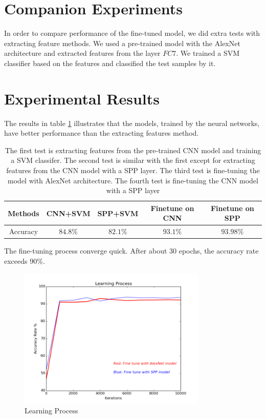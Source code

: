 \section{Companion Experiments}

In order to compare performance of the fine-tuned model, we did extra tests with extracting feature methods. We used a pre-trained model with the AlexNet architecture and extracted features from the layer $FC7$. We trained a SVM classifier based on the features and classified the test samples by it.

\section{Experimental Results}

The results in table \ref{ExpRes} illustrates that the models, trained by the neural networks, have better performance than the extracting features method. 

\begin{table}[h]
\begin{center}
    \begin{tabular}{| c | c | c | c | c |}
    \hline
    Methods & CNN+SVM & SPP+SVM & Finetune on CNN & Finetune on SPP  \\ \hline
    Accuracy & $84.8\%$ & $82.1\%$ & $93.1\%$ & $93.98\%$ \\ \hline
    \end{tabular}
    \caption{The first test is extracting features from the pre-trained CNN model and training a SVM classifer. The second test is similar with the first except for extracting features from the CNN model with a SPP layer. The third test is fine-tuning the model with AlexNet architecture. The fourth test is fine-tuning the CNN model with a SPP layer}
    \label{ExpRes}
\end{center}
\end{table}

The fine-tuning process converge quick. After about 30 epochs, the accuracy rate exceeds $90\%$. 
\graphicspath{ {./Figures/} }
\begin{figure}[!htb]
    \centering
	\includegraphics[width=0.8\textwidth]{FinetuneAccuracy.png}
    \caption{Learning Process}%
    \label{fig:finetuneprocess}%
\end{figure}


